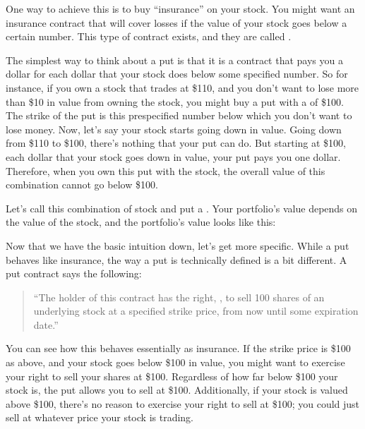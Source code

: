 \documentclass[letterpaper,10pt,english]{jupyterBook}
\begin{document}
\sphinxAtStartPar
One way to achieve this is to buy “insurance” on your stock. You might want an insurance contract that will cover losses if the value of your stock goes below a certain number. This type of contract exists, and they are called .

\sphinxAtStartPar
The simplest way to think about a put is that it is a contract that pays you a dollar for each dollar that your stock does below some specified number. So for instance, if you own a stock that trades at \$110, and you don’t want to lose more than \$10 in value from owning the stock, you might buy a put with a  of \$100. The strike of the put is this pre\sphinxhyphen{}specified number below which you don’t want to lose money. Now, let’s say your stock starts going down in value. Going down from \$110 to \$100, there’s nothing that your put can do. But starting at \$100, each dollar that your stock goes down in value, your put pays you one dollar. Therefore, when you own this put  with the stock, the overall value of this combination cannot go below \$100.

\sphinxAtStartPar
Let’s call this combination of stock and put a . Your portfolio’s value depends on the value of the stock, and the portfolio’s value looks like this:

\sphinxAtStartPar
{}

\sphinxAtStartPar
Now that we have the basic intuition down, let’s get more specific. While a put behaves like insurance, the way a put is technically defined is a bit different. A put contract says the following:
\begin{quote}

\sphinxAtStartPar
“The holder of this contract has the right, , to sell 100 shares of an underlying stock at a specified strike price, from now until some expiration date.”
\end{quote}

\sphinxAtStartPar
You can see how this behaves essentially as insurance. If the strike price is \$100 as above, and your stock goes below \$100 in value, you might want to exercise your right to sell your shares at \$100. Regardless of how far below \$100 your stock is, the put allows you to sell at \$100. Additionally, if your stock is valued above \$100, there’s no reason to exercise your right to sell at \$100; you could just sell at whatever price your stock is trading.
\end{document}
